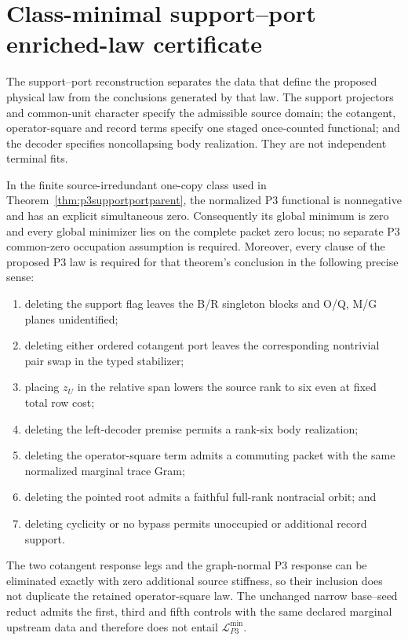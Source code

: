 \section{Class-minimal support--port enriched-law certificate}
\label{app:p3minimalparentlaw}

The support--port reconstruction separates the data that define the proposed
physical law from the conclusions generated by that law.  The support
projectors and common-unit character specify the admissible source domain;
the cotangent, operator-square and record terms specify one staged
once-counted functional; and the decoder specifies noncollapsing body
realization.  They are not independent terminal fits.

\begin{proposition}
\label{prop:p3minimalparentcertificate}
In the finite source-irredundant one-copy class used in
Theorem~\ref{thm:p3supportportparent}, the normalized P3 functional is
nonnegative and has an explicit simultaneous zero.  Consequently its global
minimum is zero and every global minimizer
lies on the complete packet zero locus; no separate P3 common-zero occupation
assumption is required.  Moreover, every clause of the proposed P3 law is
required for that theorem's conclusion in the following precise sense:
\begin{enumerate}[label=(\roman*),nosep]
\item deleting the support flag leaves the B/R singleton blocks and O/Q,
  M/G planes unidentified;
\item deleting either ordered cotangent port leaves the corresponding
  nontrivial pair swap in the typed stabilizer;
\item placing $z_U$ in the relative span lowers the source rank to six even
  at fixed total row cost;
\item deleting the left-decoder premise permits a rank-six body realization;
\item deleting the operator-square term admits a commuting packet with the
  same normalized marginal trace Gram;
\item deleting the pointed root admits a faithful full-rank nontracial orbit;
  and
\item deleting cyclicity or no bypass permits unoccupied or additional record
  support.
\end{enumerate}
The two cotangent response legs and the graph-normal P3 response can be
eliminated exactly with zero additional source stiffness, so their inclusion
does not duplicate the retained operator-square law.  The unchanged narrow
base--seed reduct admits the first, third and fifth controls with the same
declared marginal upstream data and therefore does not entail
$\mathcal L_{P3}^{\min}$.
\end{proposition}

